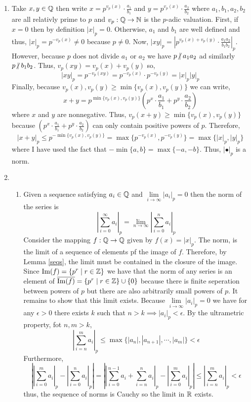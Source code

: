 \documentclass[12pt]{extarticle}
\begin{document}
 
\begin{enumerate}
\item Take $x, y \in \mathbb{Q}$ then write $x = p^{v_p(x)} \cdot \frac{a_1}{b_1}$ and $y = p^{v_p(x)} \cdot \frac{a_2}{b_2}$ where $a_1, b_1, a_2, b_2$ are all relativly prime to $p$ and $v_p : \mathbb{Q} \to \mathbb{N}$ is the $p$-adic valuation. First, if $x = 0$ then by definition $|x|_p = 0$. Otherwise, $a_1$ and $b_1$ are well defined and thus, $|x|_p = p^{-v_p(x)} \neq 0$ because $p \neq 0$. Now, $|xy|_p = |p^{v_p(x) + v_p(y)} \cdot \frac{a_1 a_2}{b_1 b_2}|_p$. However, because $p$ does not divide $a_1$ or $a_2$ we have $p \ndivides a_1 a_2$ ad similarly $p \ndivides b_1 b_2$. Thus, $v_p(xy) = v_p(x) + v_p(y)$ so, \[|xy|_p = p^{-v_p(xy)} = p^{-v_p(x)} \cdot p^{-v_p(y)} = |x|_p |y|_p\]
Finally, because $v_p(x), v_p(y) \ge \min\{v_p(x), v_p(y)\}$ we can write, \[x + y = p^{\min\{v_p(x), v_p(y)\}} \left(p^x \cdot \frac{a_1}{b_1} + p^y \cdot \frac{a_2}{b_2} \right)\] where $x$ and $y$ are nonnegative. Thus, $v_p(x + y) \ge \min\{v_p(x), v_p(y)\}$ because $\left(p^x \cdot \frac{a_1}{b_1} + p^y \cdot \frac{a_2}{b_2} \right)$ can only contain positive powers of $p$. Therefore, 
\[|x + y|_p \le p^{-\min\{v_p(x), v_p(y)\}} = \max\{p^{-v_p(x)}, p^{-v_p(y)}\} = \max\{|x|_p, |y|_p\}\]
where I have used the fact that $-\min\{a,b\} = \max\{-a, -b\}$. Thus, $| \bullet |_p$ is a norm. 

\item 

\begin{enumerate}
\item Given a sequence satisfying $a_i \in \mathbb{Q}$ and $\lim\limits_{i \to \infty} |a_i|_p = 0$ then the norm of the series is \[ \left| \sum\limits_{i = 0}^\infty a_i \right|_p = \lim\limits_{n \to \infty} \left| \sum\limits_{i = 0}^n a_i \right|_p \]
Consider the mapping $f : \mathbb{Q} \to \mathbb{Q}$ given by $f(x) = |x|_p$. The norm, is the limit of a sequence of elements pf the image of $f$. Therefore, by Lemma \ref{seqs}, the limit must be contained in the closure of the image. Since $\mathrm{Im}(f) = \{p^r \mid r \in \mathbb{Z}\}$ we have that the norm of any series is an element of $\overline{\mathrm{Im}(f)} = \{p^r \mid r \in \mathbb{Z}\} \cup \{0 \}$ because there is finite seperation between powers of $p$ but there are also arbitrarily small powers of $p$. It remains to show that this limit exists. Because $\lim\limits_{i \to \infty} |a_i|_p = 0$ we have for any $\epsilon > 0$ there exists $k$ such that $n > k \implies |a_i|_p < \epsilon$. By the ultrametric property, fot $n, m > k$,
\[ \left| \sum\limits_{i = n}^m a_i \right|_p \le \max\{|a_n|, |a_{n+1}|, \cdots, |a_m| \} < \epsilon \]
Furthermore,
\[ \left| \left| \sum\limits_{i = 0}^m a_i \right|_p - \left| \sum\limits_{i = 0}^n a_i \right|_p \right| = \left| \left| \sum\limits_{i = 0}^{n-1} a_i + \sum\limits_{i = n}^n a_i \right|_p - \left| \sum\limits_{i = 0}^m a_i \right|_p \right|  \le \left| \sum\limits_{i = n}^m a_i \right|_p  < \epsilon \]
thus, the sequence of norms is Cauchy so the limit in $\mathbb{R}$ exists. 


\end{enumerate}
\end{enumerate}
\end{document}
